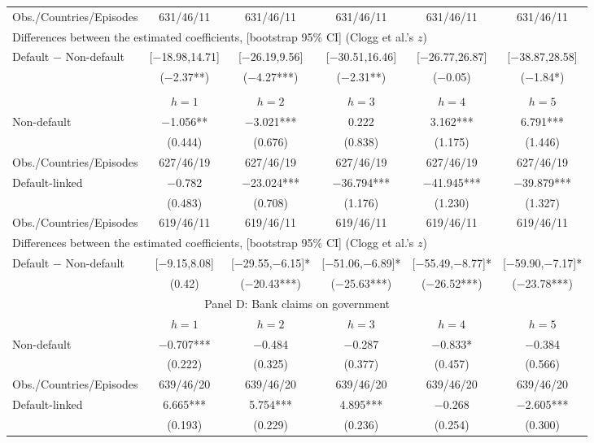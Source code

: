 \documentclass[12pt]{article}
\begin{document}
\begin{longtable}{lccccc}
Obs./Countries/Episodes & 631/46/11 & 631/46/11 & 631/46/11 & 631/46/11 & 631/46/11 \\[4pt]
\multicolumn{6}{l}{Differences between the estimated coefficients, [bootstrap 95\% CI] (Clogg et al.'s $z$)} \\[2pt]
Default $-$ Non-default & [$-$18.98,14.71] & [$-$26.19,9.56] & [$-$30.51,16.46] & [$-$26.77,26.87] & [$-$38.87,28.58] \\
 & ($-$2.37**) & ($-$4.27***) & ($-$2.31**) & ($-$0.05) & ($-$1.84*) \\
\newpage
\multicolumn{6}{c}{\large Panel C: Bank credit} \\
\toprule
 & $h=1$ & $h=2$ & $h=3$ & $h=4$ & $h=5$ \\
\midrule
Non-default & $-$1.056** & $-$3.021*** & 0.222 & 3.162*** & 6.791*** \\
 & (0.444) & (0.676) & (0.838) & (1.175) & (1.446) \\[1pt]
Obs./Countries/Episodes & 627/46/19 & 627/46/19 & 627/46/19 & 627/46/19 & 627/46/19 \\[3pt]
Default-linked & $-$0.782 & $-$23.024*** & $-$36.794*** & $-$41.945*** & $-$39.879*** \\
 & (0.483) & (0.708) & (1.176) & (1.230) & (1.327) \\[1pt]
Obs./Countries/Episodes & 619/46/11 & 619/46/11 & 619/46/11 & 619/46/11 & 619/46/11 \\[4pt]
\multicolumn{6}{l}{Differences between the estimated coefficients, [bootstrap 95\% CI] (Clogg et al.'s $z$)} \\[2pt]
Default $-$ Non-default & [$-$9.15,8.08] & [$-$29.55,$-$6.15]* & [$-$51.06,$-$6.89]* & [$-$55.49,$-$8.77]* & [$-$59.90,$-$7.17]* \\
 & (0.42) & ($-$20.43***) & ($-$25.63***) & ($-$26.52***) & ($-$23.78***) \\[5pt]
\multicolumn{6}{c}{\large Panel D: Bank claims on government} \\
\toprule
 & $h=1$ & $h=2$ & $h=3$ & $h=4$ & $h=5$ \\
\midrule
Non-default & $-$0.707*** & $-$0.484 & $-$0.287 & $-$0.833* & $-$0.384 \\
 & (0.222) & (0.325) & (0.377) & (0.457) & (0.566) \\[1pt]
Obs./Countries/Episodes & 639/46/20 & 639/46/20 & 639/46/20 & 639/46/20 & 639/46/20 \\[3pt]
Default-linked & 6.665*** & 5.754*** & 4.895*** & $-$0.268 & $-$2.605*** \\
 & (0.193) & (0.229) & (0.236) & (0.254) & (0.300) \\[1pt]

\end{longtable}
\end{document}

